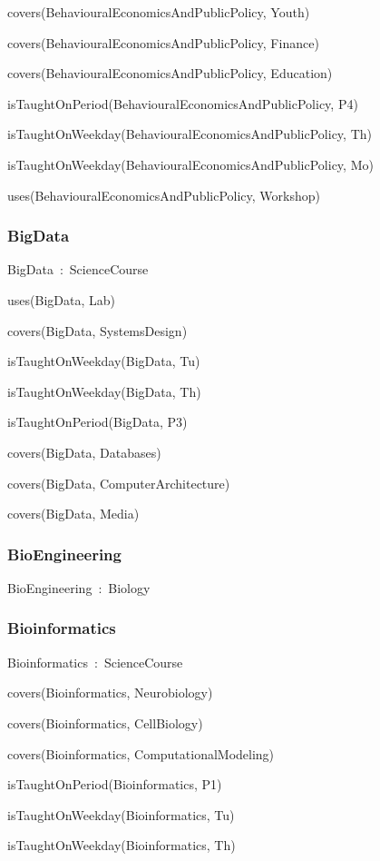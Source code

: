 \documentclass{article}
\begin{document}
covers(BehaviouralEconomicsAndPublicPolicy, Youth)

covers(BehaviouralEconomicsAndPublicPolicy, Finance)

covers(BehaviouralEconomicsAndPublicPolicy, Education)

isTaughtOnPeriod(BehaviouralEconomicsAndPublicPolicy, P4)

isTaughtOnWeekday(BehaviouralEconomicsAndPublicPolicy, Th)

isTaughtOnWeekday(BehaviouralEconomicsAndPublicPolicy, Mo)

uses(BehaviouralEconomicsAndPublicPolicy, Workshop)

\subsubsection*{BigData}

BigData~:~ScienceCourse

uses(BigData, Lab)

covers(BigData, SystemsDesign)

isTaughtOnWeekday(BigData, Tu)

isTaughtOnWeekday(BigData, Th)

isTaughtOnPeriod(BigData, P3)

covers(BigData, Databases)

covers(BigData, ComputerArchitecture)

covers(BigData, Media)

\subsubsection*{BioEngineering}

BioEngineering~:~Biology

\subsubsection*{Bioinformatics}

Bioinformatics~:~ScienceCourse

covers(Bioinformatics, Neurobiology)

covers(Bioinformatics, CellBiology)

covers(Bioinformatics, ComputationalModeling)

isTaughtOnPeriod(Bioinformatics, P1)

isTaughtOnWeekday(Bioinformatics, Tu)

isTaughtOnWeekday(Bioinformatics, Th)
\end{document}
